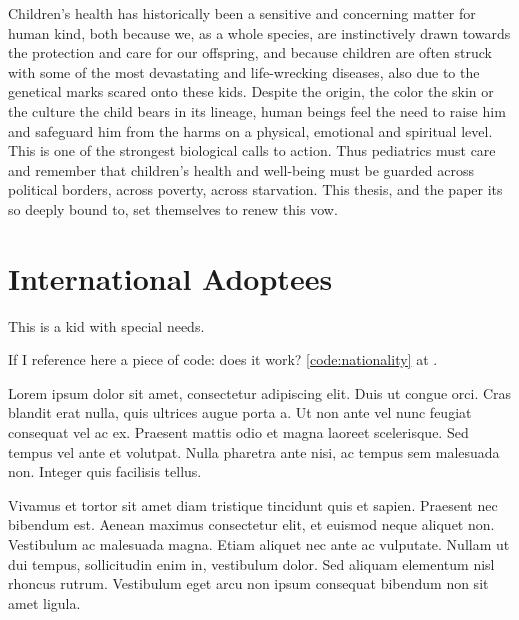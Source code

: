 

\label{chap:introduction}
Children's health has historically been a sensitive and concerning matter for human kind, both because we, as a whole species, are instinctively drawn towards the protection and care for our offspring, and because children are often struck with some of the most devastating and life-wrecking diseases, also due to the genetical marks scared onto these kids. Despite the origin, the color the skin or the culture the child bears in its lineage, human beings feel the need to raise him and safeguard him from the harms on a physical, emotional and spiritual level. This is one of the strongest biological calls to action.
Thus pediatrics must care and remember that children's health and well-being must be guarded across political borders, across poverty, across starvation. This thesis, and the paper its so deeply bound to, set themselves to renew this vow.

\section{International Adoptees}\label{sec:internationaladoptees}
This is a kid with special needs.

If I reference here a piece of code: does it work? \ref{code:nationality} at \pageref{code:nationality}.

Lorem ipsum dolor sit amet, consectetur adipiscing elit. Duis ut congue orci. Cras blandit erat nulla, quis ultrices augue porta a. Ut non ante vel nunc feugiat consequat vel ac ex. Praesent mattis odio et magna laoreet scelerisque. Sed tempus vel ante et volutpat. Nulla pharetra ante nisi, ac tempus sem malesuada non. Integer quis facilisis tellus.

Vivamus et tortor sit amet diam tristique tincidunt quis et sapien. Praesent nec bibendum est. Aenean maximus consectetur elit, et euismod neque aliquet non. Vestibulum ac malesuada magna. Etiam aliquet nec ante ac vulputate. Nullam ut dui tempus, sollicitudin enim in, vestibulum dolor. Sed aliquam elementum nisl rhoncus rutrum. Vestibulum eget arcu non ipsum consequat bibendum non sit amet ligula.

